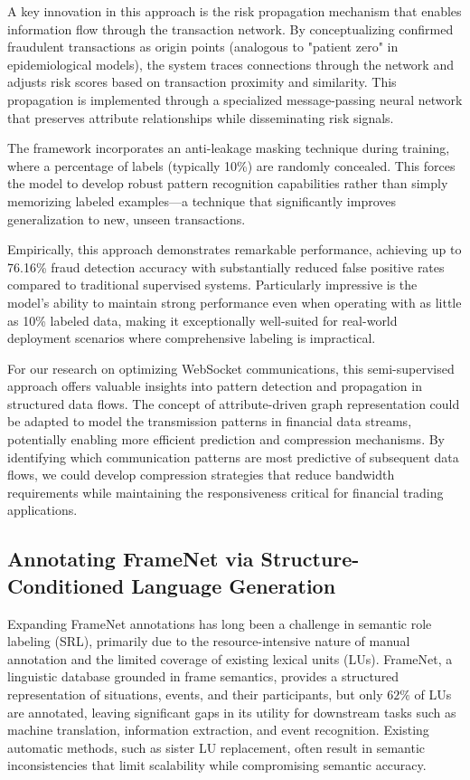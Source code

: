 \documentclass[a4paper, 11pt, twoside, openright]{report}
\begin{document}
A key innovation in this approach is the risk propagation mechanism that enables information flow through the transaction network. By conceptualizing confirmed fraudulent transactions as origin points (analogous to "patient zero" in epidemiological models), the system traces connections through the network and adjusts risk scores based on transaction proximity and similarity. This propagation is implemented through a specialized message-passing neural network that preserves attribute relationships while disseminating risk signals.

The framework incorporates an anti-leakage masking technique during training, where a percentage of labels (typically 10\%) are randomly concealed. This forces the model to develop robust pattern recognition capabilities rather than simply memorizing labeled examples—a technique that significantly improves generalization to new, unseen transactions.

Empirically, this approach demonstrates remarkable performance, achieving up to 76.16\% fraud detection accuracy with substantially reduced false positive rates compared to traditional supervised systems. Particularly impressive is the model's ability to maintain strong performance even when operating with as little as 10\% labeled data, making it exceptionally well-suited for real-world deployment scenarios where comprehensive labeling is impractical.

For our research on optimizing WebSocket communications, this semi-supervised approach offers valuable insights into pattern detection and propagation in structured data flows. The concept of attribute-driven graph representation could be adapted to model the transmission patterns in financial data streams, potentially enabling more efficient prediction and compression mechanisms. By identifying which communication patterns are most predictive of subsequent data flows, we could develop compression strategies that reduce bandwidth requirements while maintaining the responsiveness critical for financial trading applications.

\subsection{Annotating FrameNet via Structure-Conditioned Language Generation}

Expanding FrameNet annotations has long been a challenge in semantic role labeling (SRL), primarily due to the resource-intensive nature of manual annotation and the limited coverage of existing lexical units (LUs). FrameNet, a linguistic database grounded in frame semantics, provides a structured representation of situations, events, and their participants, but only \(62\%\) of LUs are annotated, leaving significant gaps in its utility for downstream tasks such as machine translation, information extraction, and event recognition. Existing automatic methods, such as sister LU replacement, often result in semantic inconsistencies that limit scalability while compromising semantic accuracy.
\end{document}
